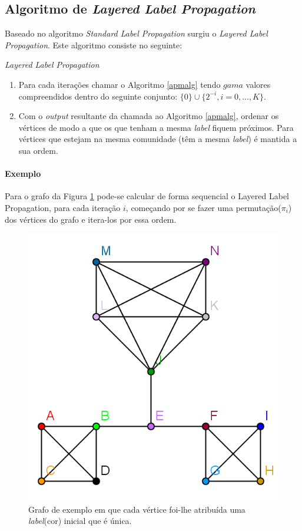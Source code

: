   \subsection{Algoritmo de \textit{Layered Label Propagation}}
  Baseado no algoritmo \textit{Standard Label Propagation} surgiu o \textit{Layered Label Propagation}. Este algoritmo consiste no seguinte:
  
  \begin{algorithm}[H]
    \caption{\textit{Layered Label Propagation}}\label{llpalg}
    \begin{enumerate}
    \item Para cada iterações chamar o Algoritmo \ref{apmalg} tendo $gama$ valores compreendidos dentro do seguinte conjunto: $\{0\}\cup\{2^{{-}i},i=0,...,K\} $.
    \item Com o \textit{output} resultante da chamada ao Algoritmo \ref{apmalg}, ordenar os vértices de modo a que os que tenham a mesma \textit{label} fiquem próximos. Para vértices que estejam na mesma comunidade (têm a mesma \textit{label}) é mantida a sua ordem.
    \end{enumerate} 
  \end{algorithm}
  
  \paragraph{Exemplo} Para o grafo da Figura \ref{graph0llp} pode-se calcular 
de forma sequencial o Layered Label Propagation, para cada iteração $i$, 
começando por se fazer uma permutação($\pi_i$) dos vértices do grafo e itera-los 
por essa ordem. 
  
  \begin{figure}[H]
    \center
    \includegraphics{graph_step0.png}
    \caption{Grafo de exemplo em que cada vértice foi-lhe atribuída uma \textit{label}(cor) inicial que é única.}
    \label{graph0llp}
  \end{figure}
  
